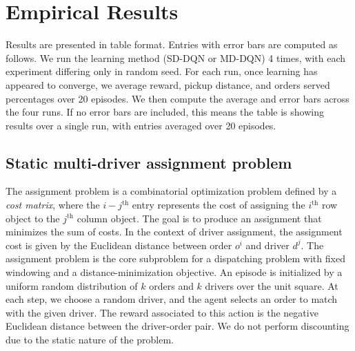 \section{Empirical Results}

Results are presented in table format. Entries with error bars are computed as follows. We run the learning method (SD-DQN or MD-DQN) 4 times, with each experiment differing only in random seed. For each run, once learning has appeared to converge, we average reward, pickup distance, and orders served percentages over 20 episodes. We then compute the average and error bars across the four runs. If no error bars are included, this means the table is showing results over a single run, with entries averaged over 20 episodes.

\subsection{Static multi-driver assignment problem}

The assignment problem \cite{munkres1957algorithms} is a combinatorial optimization problem defined by a {\em cost matrix}, where the $i-j^{\mathrm{th}}$ entry represents the cost of assigning the $i^{\mathrm{th}}$ row object to the $j^{\mathrm{th}}$ column object. The goal is to produce an assignment that minimizes the sum of costs. In the context of driver assignment, the assignment cost is given by the Euclidean distance between order $o^i$ and driver $d^j$. The assignment problem is the core subproblem for a dispatching problem with fixed windowing and a distance-minimization objective. An episode is initialized by a uniform random distribution of $k$ orders and $k$ drivers over the unit square. At each step, we choose a random driver, and the agent selects an order to match with the given driver. The reward associated to this action is the negative Euclidean distance between the driver-order pair. We do not perform discounting due to the static nature of the problem. 
    

